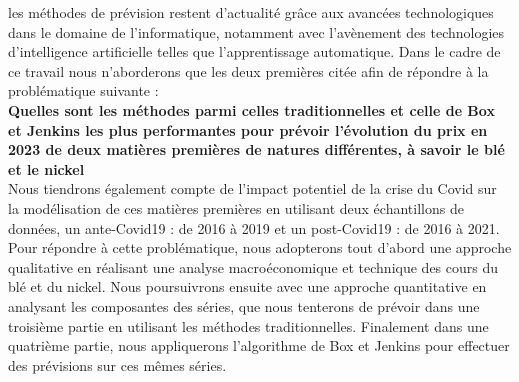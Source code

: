les méthodes de prévision restent d'actualité grâce aux avancées technologiques dans le domaine de l'informatique, notamment avec l'avènement des technologies 
d'intelligence artificielle telles que l'apprentissage automatique. Dans le cadre de ce travail nous n'aborderons que les deux premières citée afin de répondre à la
problématique suivante : \\[5pt]
\textbf{Quelles sont les méthodes parmi celles traditionnelles et celle de Box et Jenkins les plus performantes pour prévoir l'évolution du prix en 2023 de deux matières premières de natures différentes, à savoir le blé et le nickel}\\[5pt]
Nous tiendrons également compte de l'impact potentiel de la crise du Covid sur la modélisation de ces matières premières en utilisant deux échantillons de données, un 
ante-Covid19 : de 2016 à 2019 et un post-Covid19 : de 2016 à 2021.\\
Pour répondre à cette problématique, nous adopterons tout d'abord une approche qualitative en réalisant une analyse macroéconomique et technique des cours du blé et du 
nickel. Nous poursuivrons ensuite avec une approche quantitative en analysant les composantes des séries, que nous tenterons de prévoir dans une troisième partie en 
utilisant les méthodes traditionnelles. Finalement dans une quatrième partie, nous appliquerons l'algorithme de Box et Jenkins pour effectuer des prévisions sur ces mêmes 
séries.